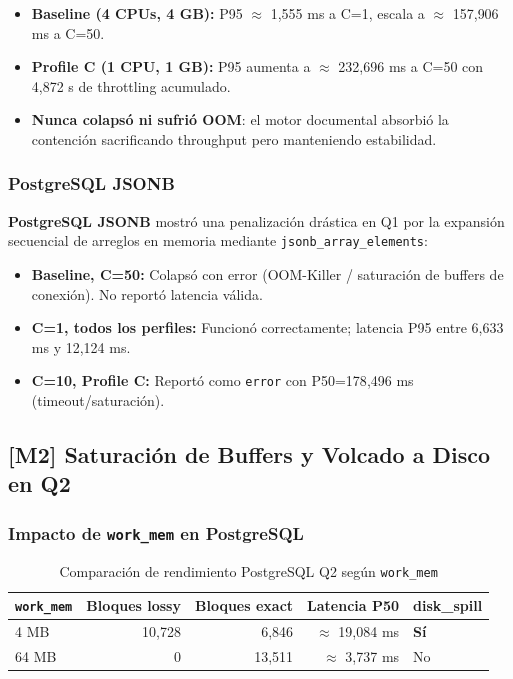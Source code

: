\documentclass[12pt,a4paper]{article}
\newcommand{\pg}{\textcolor{pgblue}{\textbf{PostgreSQL JSONB}}}
\begin{document}
\begin{itemize}
  \item \textbf{Baseline (4 CPUs, 4 GB):} P95 $\approx$ 1{,}555 ms a C=1, escala a $\approx$ 157{,}906 ms a C=50.
  \item \textbf{Profile C (1 CPU, 1 GB):} P95 aumenta a $\approx$ 232{,}696 ms a C=50 con 4{,}872 s de throttling acumulado.
  \item \textbf{Nunca colapsó ni sufrió OOM}: el motor documental absorbió la contención sacrificando throughput pero manteniendo estabilidad.
\end{itemize}

\subsubsection{PostgreSQL JSONB}

\pg{} mostró una penalización drástica en Q1 por la expansión secuencial de arreglos en memoria mediante \texttt{jsonb\_array\_elements}:

\begin{itemize}
  \item \textbf{Baseline, C=50:} Colapsó con error (OOM-Killer / saturación de buffers de conexión). No reportó latencia válida.
  \item \textbf{C=1, todos los perfiles:} Funcionó correctamente; latencia P95 entre 6{,}633 ms y 12{,}124 ms.
  \item \textbf{C=10, Profile C:} Reportó como \texttt{error} con P50=178{,}496 ms (timeout/saturación).
\end{itemize}

\subsection{[M2] Saturación de Buffers y Volcado a Disco en Q2}

\subsubsection{Impacto de \texttt{work\_mem} en PostgreSQL}

\begin{table}[H]
\centering
\caption{Comparación de rendimiento PostgreSQL Q2 según \texttt{work\_mem}}
\begin{tabular}{lrrrl}
\toprule
\texttt{work\_mem} & \textbf{Bloques lossy} & \textbf{Bloques exact} & \textbf{Latencia P50} & \textbf{disk\_spill} \\
\midrule
4 MB  & 10{,}728 & 6{,}846  & $\approx$ 19{,}084 ms & \textcolor{alertred}{\textbf{Sí}} \\
64 MB & 0        & 13{,}511 & $\approx$ 3{,}737 ms  & No \\
\bottomrule
\end{tabular}
\end{table}
\end{document}

